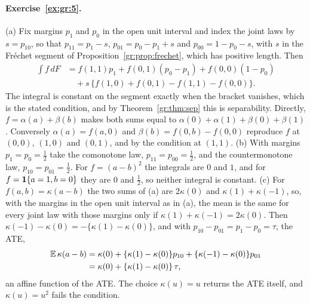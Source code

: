 \paragraph{Exercise~\ref{ex:gr:5}.} (a) Fix margins $p_1$ and $p_0$ in the open unit interval and index the joint laws by $s=p_{10}$, so that $p_{11}=p_1-s$, $p_{01}=p_0-p_1+s$ and $p_{00}=1-p_0-s$, with $s$ in the Fr\'echet segment of Proposition~\ref{gr:prop:frechet}, which has positive length. Then
\[
\begin{aligned}
\int f\,dF&=f(1,1)p_1+f(0,1)(p_0-p_1)+f(0,0)(1-p_0)\\
&\quad+s\,\{f(1,0)+f(0,1)-f(1,1)-f(0,0)\}.
\end{aligned}
\]
The integral is constant on the segment exactly when the bracket vanishes, which is the stated condition, and by Theorem~\ref{gr:thm:sep} this is separability. Directly, $f=\alpha(a)+\beta(b)$ makes both sums equal to $\alpha(0)+\alpha(1)+\beta(0)+\beta(1)$. Conversely $\alpha(a)=f(a,0)$ and $\beta(b)=f(0,b)-f(0,0)$ reproduce $f$ at $(0,0)$, $(1,0)$ and $(0,1)$, and by the condition at $(1,1)$. (b) With margins $p_1=p_0=\tfrac12$ take the comonotone law, $p_{11}=p_{00}=\tfrac12$, and the countermonotone law, $p_{10}=p_{01}=\tfrac12$. For $f=(a-b)^2$ the integrals are $0$ and $1$, and for $f=\mathbf{1}\{a=1,b=0\}$ they are $0$ and $\tfrac12$, so neither integral is constant. (c) For $f(a,b)=\kappa(a-b)$ the two sums of (a) are $2\kappa(0)$ and $\kappa(1)+\kappa(-1)$, so, with the margins in the open unit interval as in (a), the mean is the same for every joint law with those margins only if $\kappa(1)+\kappa(-1)=2\kappa(0)$. Then $\kappa(-1)-\kappa(0)=-\{\kappa(1)-\kappa(0)\}$, and with $p_{10}-p_{01}=p_1-p_0=\tau$, the ATE,
\[
\begin{aligned}
\mathbb{E}\,\kappa(a-b)&=\kappa(0)+\{\kappa(1)-\kappa(0)\}p_{10}+\{\kappa(-1)-\kappa(0)\}p_{01}\\
&=\kappa(0)+\{\kappa(1)-\kappa(0)\}\,\tau,
\end{aligned}
\]
an affine function of the ATE. The choice $\kappa(u)=u$ returns the ATE itself, and $\kappa(u)=u^2$ fails the condition.

